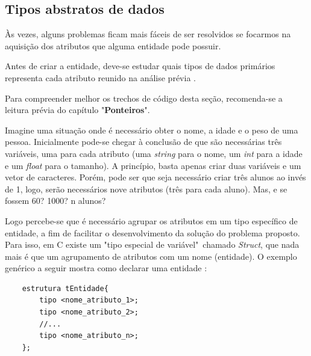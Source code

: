 \documentclass[12pt]{article}
\newcommand\tab[1][1cm]{\hspace*{#1}}
\begin{document}
\newpage

\subsection{Tipos abstratos de dados}

\par\tab Às vezes, alguns problemas ficam mais fáceis de ser resolvidos se focarmos na aquisição dos atributos que alguma entidade pode possuir.

\par\tab Antes de criar a entidade, deve-se estudar quais tipos de dados primários representa cada atributo reunido na análise prévia \cite{wiki:tad}\cite{wiki:adt}.

\hspace{0.25cm}
\begin{tcolorbox}[colback=violet!5!white,colframe=violet!75!black,title=Dica!]
  \par\tab Para compreender melhor os trechos de código desta seção, recomenda-se a leitura prévia do capítulo "\textbf{Ponteiros}".
\end{tcolorbox}

\par\tab Imagine uma situação onde é necessário obter o nome, a idade e o peso de uma pessoa. Inicialmente pode-se chegar à conclusão de que são necessárias três variáveis, uma para cada atributo (uma \textit{string} para o nome, um \textit{int} para a idade e um \textit{float} para o tamanho). A princípio, basta apenas criar duas variáveis e um vetor de caracteres. Porém, pode ser que seja necessário criar três alunos ao invés de 1, logo, serão necessários nove atributos (três para cada aluno). Mas, e se fossem 60? 1000? n alunos?

\par\tab Logo percebe-se que é necessário agrupar os atributos em um tipo específico de entidade, a fim de facilitar o desenvolvimento da solução do problema proposto. Para isso, em C existe um "tipo especial de variável"~chamado \textit{Struct}, que nada mais é que um agrupamento de atributos com um nome  (entidade). O exemplo genérico a seguir mostra como declarar uma entidade \cite{wiki:tad}:

\hspace{0.25cm}
\begin{lstlisting}
    estrutura tEntidade{
        tipo <nome_atributo_1>;
        tipo <nome_atributo_2>;
        //...
        tipo <nome_atributo_n>;
    };
\end{lstlisting}
\end{document}
